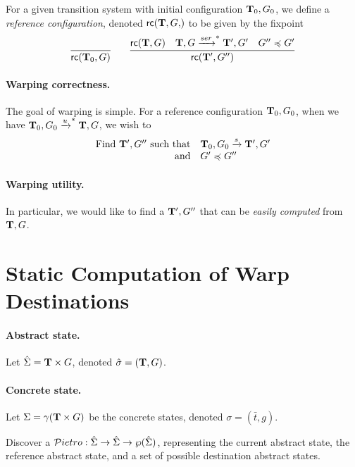 \newcommand\rc[2]{\textsf{rc}(#1,#2)}
\begin{definition}
For a given transition system with initial configuration $\mathbf{T}_0,G_0$,
we define a \emph{reference configuration}, denoted
$\rc{\Ts,G}$ to be given by the fixpoint
$$
\infer{\rc{\Ts_0}{G}}{}
\qquad
\infer{\rc{\Ts'}{G''}}{
   \rc{\Ts}{G}
&  \Ts,G \xrightarrow{ser}^{*} \Ts',G'
&  G'' \opeq G'
}
$$
\end{definition}

\paragraph{Warping correctness.} The goal of warping is simple. For a reference
configuration $\mathbf{T}_0,G_0$, when we have 
$\mathbf{T}_0,G_0 \xrightarrow{u}^{*} \mathbf{T},G$, we wish to
\[ \begin{array}{rl}
   \text{Find } \mathbf{T}',G'' \text{ such that}&
      \mathbf{T}_0,G_0 \xrightarrow{s} \mathbf{T}',G'\\
  \text{and}&G' \preccurlyeq G''
\end{array} \]

\paragraph{Warping utility.}
In particular, we would like to find a $\mathbf{T}',G''$ that can be 
\emph{easily computed} from $\mathbf{T},G$.



\section{Static Computation of Warp Destinations}

\paragraph{Abstract state.}
Let $\hat{\Sigma} = \mathbf{T} \times G$, denoted $\hat{\sigma} = (\mathbf{T},G)$.

\newcommand\ts{\bar{t}}

\paragraph{Concrete state.}
Let $\Sigma = \gamma(\mathbf{T} \times G)$ be the concrete states, denoted $\sigma = (\ts,g)$.

\newcommand\Pietrot{{\cal P}ietro}

Discover a $\Pietrot : \hat{\Sigma} \rightarrow \hat{\Sigma}
\rightarrow \wp({\hat{\Sigma}})$, representing the current abstract
state, the reference abstract state, and a set of possible destination
abstract states.


